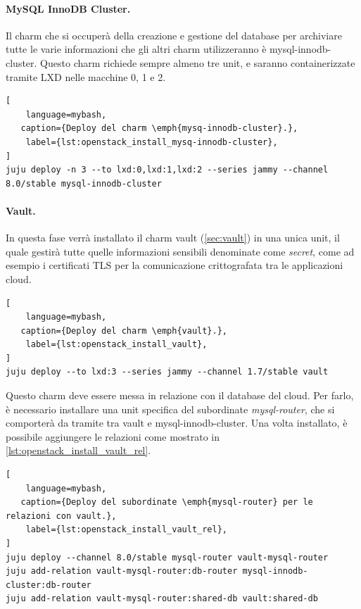 \paragraph{MySQL InnoDB Cluster.}
Il charm che si occuperà della creazione e gestione del database per archiviare tutte le varie informazioni che gli altri charm utilizzeranno è mysql-innodb-cluster.
% 
Questo charm richiede sempre almeno tre unit, e saranno containerizzate tramite LXD nelle macchine 0, 1 e 2.
\begin{lstlisting}[
    language=mybash, 
   caption={Deploy del charm \emph{mysq-innodb-cluster}.},
    label={lst:openstack_install_mysq-innodb-cluster},
]
juju deploy -n 3 --to lxd:0,lxd:1,lxd:2 --series jammy --channel 8.0/stable mysql-innodb-cluster
\end{lstlisting}



\paragraph{Vault.}
In questa fase verrà installato il charm vault (\cref{sec:vault}) in una unica unit, il quale gestirà tutte quelle informazioni sensibili denominate come \emph{secret}, come ad esempio i certificati TLS per la comunicazione crittografata tra le applicazioni cloud.
\begin{lstlisting}[
    language=mybash, 
   caption={Deploy del charm \emph{vault}.},
    label={lst:openstack_install_vault},
]
juju deploy --to lxd:3 --series jammy --channel 1.7/stable vault
\end{lstlisting}

\bigskip\noindent
Questo charm deve essere messa in relazione con il database del cloud.
% 
Per farlo, è necessario installare una unit specifica del subordinate \emph{mysql-router}, che si comporterà da tramite tra vault e mysql-innodb-cluster.
% 
Una volta installato, è possibile aggiungere le relazioni come mostrato in \cref{lst:openstack_install_vault_rel}.
\begin{lstlisting}[
    language=mybash, 
   caption={Deploy del subordinate \emph{mysql-router} per le relazioni con vault.},
    label={lst:openstack_install_vault_rel},
]
juju deploy --channel 8.0/stable mysql-router vault-mysql-router
juju add-relation vault-mysql-router:db-router mysql-innodb-cluster:db-router
juju add-relation vault-mysql-router:shared-db vault:shared-db
\end{lstlisting}


